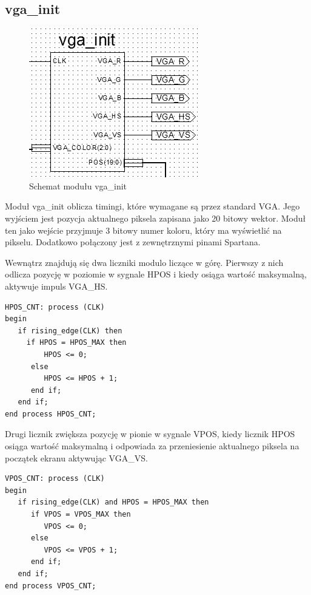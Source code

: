 \documentclass[11pt]{article}
\begin{document}
\subsection{vga\_init}

\begin{figure}[H]
\center
\includegraphics[scale=1]{VGA_init.png}
\caption{Schemat modułu vga\_init}
\end{figure}

Moduł vga\_init oblicza timingi, które wymagane są przez standard VGA.
Jego wyjściem jest pozycja aktualnego piksela zapisana jako 20 bitowy wektor.
Moduł ten jako wejście przyjmuje 3 bitowy numer koloru, który ma wyświetlić na pikselu.
Dodatkowo połączony jest z zewnętrznymi pinami Spartana.

Wewnątrz znajdują się dwa liczniki modulo liczące w górę.
Pierwszy z nich odlicza pozycję w poziomie w sygnale HPOS i kiedy osiąga wartość maksymalną, aktywuje impuls VGA\_HS.

\begin{lstlisting}[caption=Sterowanie pozycją piksela w poziomie]
HPOS_CNT: process (CLK) 
begin
   if rising_edge(CLK) then
     if HPOS = HPOS_MAX then
         HPOS <= 0;
      else
         HPOS <= HPOS + 1;
      end if;
   end if;
end process HPOS_CNT;
\end{lstlisting}

Drugi licznik zwiększa pozycję w pionie w sygnale VPOS, kiedy licznik HPOS osiąga wartość maksymalną i odpowiada za przeniesienie aktualnego piksela na początek ekranu aktywując VGA\_VS.

\begin{lstlisting}[caption=Sterowanie pozycją piksela w pionie]
VPOS_CNT: process (CLK) 
begin
   if rising_edge(CLK) and HPOS = HPOS_MAX then
      if VPOS = VPOS_MAX then
         VPOS <= 0;
      else
         VPOS <= VPOS + 1;
      end if;
   end if;
end process VPOS_CNT;
\end{lstlisting}
\end{document}
